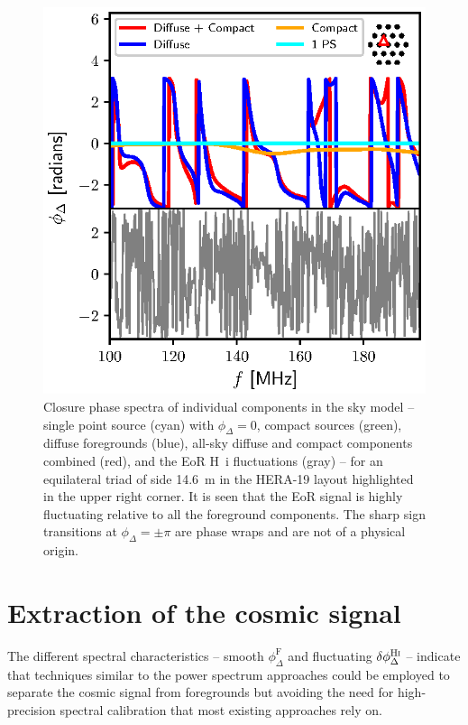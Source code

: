 \documentclass[
reprint,
superscriptaddress,
amsmath,
amssymb,
aps,
prd
]{revtex4-1}
\begin{document}
\begin{figure}[htb]
\includegraphics[width=0.85\linewidth]{closure_phase_spectra_1_15_16}
\caption{Closure phase spectra of individual components in the sky model -- single point source (cyan) with $\phi_\Delta=0$, compact sources (green), diffuse foregrounds (blue), all-sky diffuse and compact components combined (red), and the EoR H~{\sc i} fluctuations (gray) -- for an equilateral triad of side 14.6~m in the HERA-19 layout highlighted in the upper right corner. It is seen that the EoR signal is highly fluctuating relative to all the foreground components. The sharp sign transitions at $\phi_\Delta=\pm \pi$ are phase wraps and are not of a physical origin. \label{fig:cp-spectra}}
\end{figure}

\section{Extraction of the cosmic signal}\label{sec:extraction}

The different spectral characteristics -- smooth $\phi_\Delta^\textrm{F}$ and fluctuating $\delta\phi_\Delta^\textrm{H{\sc i}}$ -- indicate that techniques similar to the power spectrum approaches could be employed to separate the cosmic signal from foregrounds but avoiding the need for high-precision spectral calibration that most existing approaches rely on.
\end{document}
